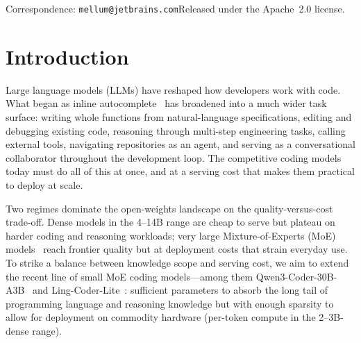 \documentclass{llmxive}
\begin{document}
\par\vspace*{\fill}
{\small\noindent
Correspondence: \texttt{mellum@jetbrains.com}\hfill Released under the Apache~2.0 license.}
\par\vspace{6pt}
\noindent\makebox[0pt][l]{\hspace*{-2.4cm}\rule{\paperwidth}{3.5pt}}\par
\vspace*{-1ex}







\section{Introduction}
\label{sec:introduction}

Large language models (LLMs) have reshaped how developers work with code.
What began as inline autocomplete~\cite{li2023starcoder} has broadened into
a much wider task surface: writing whole functions from
natural-language specifications, editing and debugging existing code,
reasoning through multi-step engineering tasks, calling external tools,
navigating repositories as an agent, and serving as a conversational
collaborator throughout the development loop. The competitive coding models
today must do all of this at once, and at a serving cost that makes them
practical to deploy at scale.

Two regimes dominate the open-weights landscape on the quality-versus-cost
trade-off. Dense models in the 4--14B range are cheap to serve but plateau on
harder coding and reasoning workloads; very large Mixture-of-Experts (MoE)
models~\cite{fedus2022switch,dai2024deepseekmoe} reach frontier quality but at
deployment costs that strain everyday use. To strike a balance between knowledge scope and serving cost, we aim to extend the recent line of small
MoE coding models---among them Qwen3-Coder-30B-A3B~\cite{yang2025qwen3} and Ling-Coder-Lite~\cite{codefuse2025lingcoderlite}: sufficient parameters to absorb the long tail of programming language and reasoning knowledge but with enough sparsity to allow for deployment on commodity hardware (per-token compute in the 2--3B-dense range).
  
\end{document}
